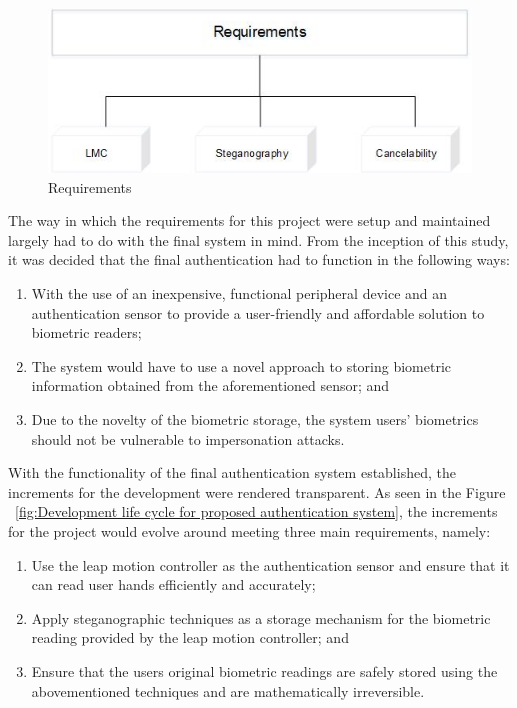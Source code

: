     
    \begin{figure}[htbp!] 
    \centering    
    \includegraphics[width=1.0\textwidth]{Chapter3/Figs/Requirements.jpg}
    \caption[Requirements]{Requirements}
    \label{fig:Requirements}
    \end{figure}    
    
    The way in which the requirements for this project were setup and maintained largely had to do with the final system in mind. From the inception of this study, it was decided that the final authentication had to function in the following ways:
    
    \begin{enumerate}[label=\roman*.]
    	\item With the use of an inexpensive, functional peripheral device and an authentication sensor to provide a user-friendly and affordable solution to biometric readers;
    	\item The system would have to use a novel approach to storing biometric information obtained from the aforementioned sensor; and
    	\item Due to the novelty of the biometric storage, the system users’ biometrics should not be vulnerable to impersonation attacks.
    \end{enumerate}
    
With the functionality of the final authentication system established, the increments for the development were rendered transparent. As seen in the Figure ~\ref{fig:Development life cycle for proposed authentication system}, the increments for the project would evolve around meeting three main requirements, namely:

    \begin{enumerate}[label=\roman*.]
        \item Use the leap motion controller as the authentication sensor and ensure that it can read user hands efficiently and accurately;
        \item Apply steganographic techniques as a storage mechanism for the biometric reading provided by the leap motion controller; and
        \item Ensure that the users original biometric readings are safely stored using the abovementioned techniques and are mathematically irreversible.
    \end{enumerate}
    
